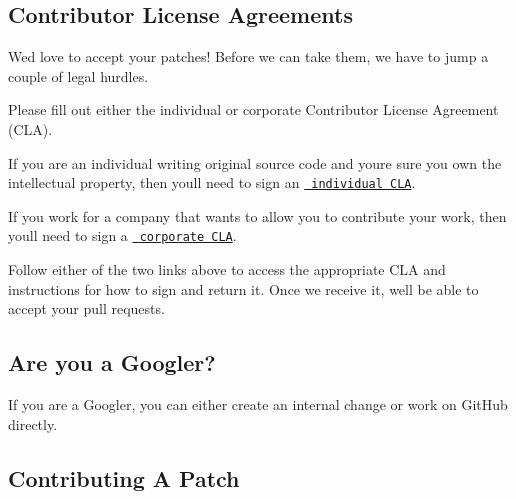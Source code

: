 \subsection*{Contributor License Agreements}

We\textquotesingle{}d love to accept your patches! Before we can take them, we have to jump a couple of legal hurdles.

Please fill out either the individual or corporate Contributor License Agreement (C\+LA).


\begin{DoxyItemize}
\item If you are an individual writing original source code and you\textquotesingle{}re sure you own the intellectual property, then you\textquotesingle{}ll need to sign an \href{https://developers.google.com/open-source/cla/individual}{\texttt{ individual C\+LA}}.
\item If you work for a company that wants to allow you to contribute your work, then you\textquotesingle{}ll need to sign a \href{https://developers.google.com/open-source/cla/corporate}{\texttt{ corporate C\+LA}}.
\end{DoxyItemize}

Follow either of the two links above to access the appropriate C\+LA and instructions for how to sign and return it. Once we receive it, we\textquotesingle{}ll be able to accept your pull requests.

\subsection*{Are you a Googler?}

If you are a Googler, you can either create an internal change or work on Git\+Hub directly.

\subsection*{Contributing A Patch}


